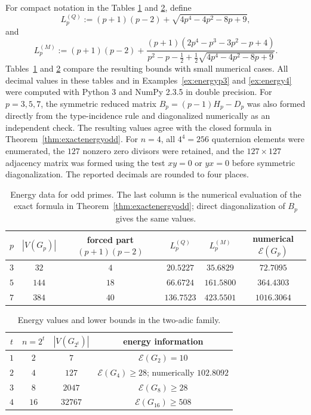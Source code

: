 \documentclass[12pt]{article}
\theoremstyle{definition}
\begin{document}
	
	For compact notation in the Tables \ref{tab:energyodd} and \ref{tab:energy2power}, define
	$$
	L_p^{(Q)}:=(p+1)(p-2)+\sqrt{4p^4-4p^2-8p+9},
	$$
	and
	$$
	L_p^{(M)}:=
	(p+1)(p-2)
	+
	\frac{(p+1)(2p^4-p^3-3p^2-p+4)}
	{p^2-p-\frac12+\frac12\sqrt{4p^4-4p^2-8p+9}}.
	$$
	Tables~\ref{tab:energyodd} and \ref{tab:energy2power} compare the resulting bounds with small numerical cases. All decimal values in these tables and in Examples~\ref{ex:energyp3} and \ref{ex:energy4} were computed with Python 3 and NumPy 2.3.5 in double precision. For $p=3,5,7$, the symmetric reduced matrix $B_p=(p-1)H_p-D_p$ was also formed directly from the type-incidence rule and diagonalized numerically as an independent check. The resulting values agree with the closed formula in Theorem~\ref{thm:exactenergyodd}. For $n=4$, all $4^4=256$ quaternion elements were enumerated, the $127$ nonzero zero divisors were retained, and the $127\times127$ adjacency matrix was formed using the test $xy=0$ or $yx=0$ before symmetric diagonalization. The reported decimals are rounded to four places.
	
	\begin{table}[H]
		\centering
		\caption{Energy data for odd primes. The last column is the numerical evaluation of the exact formula in Theorem~\ref{thm:exactenergyodd}; direct diagonalization of $B_p$ gives the same values.}
		\label{tab:energyodd}
		\begin{tabular}{cccccc}
			\toprule
			$p$ & $|V(G_p)|$ & forced part $(p+1)(p-2)$ & $L_p^{(Q)}$ & $L_p^{(M)}$ & numerical $\mathcal E(G_p)$ \\
			\midrule
			$3$ & $32$  & $4$  & $20.5227$  & $35.6829$  & $72.7095$ \\
			$5$ & $144$ & $18$ & $66.6724$  & $161.5800$ & $364.4303$ \\
			$7$ & $384$ & $40$ & $136.7523$ & $423.5501$ & $1016.3064$ \\
			\bottomrule
		\end{tabular}
	\end{table}
	
	\begin{table}[H]
		\centering
		\caption{Energy values and lower bounds in the two-adic family.}
		\label{tab:energy2power}
		\small
		\begin{tabular}{cccc}
			\toprule
			$t$ & $n=2^t$ & $|V(G_{2^t})|$ & energy information \\
			\midrule
			$1$ & $2$  & $7$     & $\mathcal E(G_2)=10$ \\
			$2$ & $4$  & $127$   & $\mathcal E(G_4)\ge 28$; numerically $102.8092$ \\
			$3$ & $8$  & $2047$  & $\mathcal E(G_8)\ge 28$ \\
			$4$ & $16$ & $32767$ & $\mathcal E(G_{16})\ge 508$ \\
			\bottomrule
		\end{tabular}
	\end{table}
	
\end{document}

